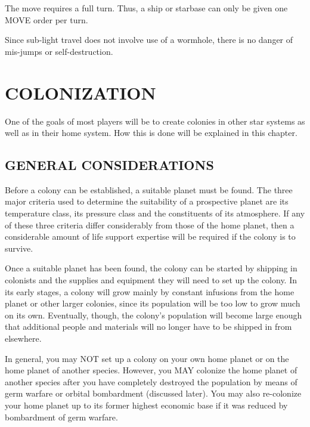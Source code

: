 \documentclass[10pt,titlepage]{article}
\begin{document}
The move requires a full turn.  Thus, a ship or starbase can only be given one
MOVE order per turn.

Since sub-light travel does not involve use of a wormhole, there is no danger
of mis-jumps or self-destruction.



\section{COLONIZATION}
\label{sec:colonization}

One of the goals of most players will be to create colonies in other star
systems as well as in their home system.  How this is done will be explained
in this chapter.


\subsection{GENERAL CONSIDERATIONS}
\label{sec:generalconsiderations}


Before a colony can be established, a suitable planet must be found.  The
three major criteria used to determine the suitability of a prospective planet
are its temperature class, its pressure class and the constituents of its
atmosphere.  If any of these three criteria differ considerably from those of
the home planet, then a considerable amount of life support expertise will be
required if the colony is to survive.

Once a suitable planet has been found, the colony can be started by shipping in
colonists and the supplies and equipment they will need to set up the colony.
In its early stages, a colony will grow mainly by constant infusions from the
home planet or other larger colonies, since its population will be too low to
grow much on its own.  Eventually, though, the colony's population will become
large enough that additional people and materials will no longer have to be
shipped in from elsewhere.

\begin{importantnote}
	In general, you may NOT set up a colony on your own home planet
	or on the home planet of another species.  However, you MAY
	colonize the home planet of another species after you have
	completely destroyed the population by means of germ warfare or
	orbital bombardment (discussed later).  You may also re-colonize
	your home planet up to its former highest economic base if it
	was reduced by bombardment of germ warfare.
\end{importantnote}
\end{document}
